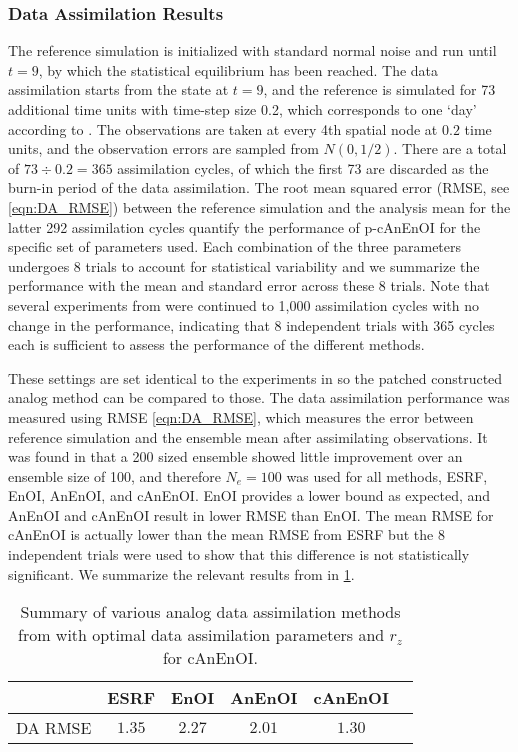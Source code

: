 \documentclass[final,3p]{elsarticle}
\theoremstyle{break}
\begin{document}
\subsubsection{Data Assimilation Results}\label{NR:DA}
The reference simulation is initialized with standard normal noise and run until $t=9$, by which the statistical equilibrium has been reached.
The data assimilation starts from the state at $t=9$, and the reference is simulated for 73 additional time units with time-step size 0.2, which corresponds to one `day' according to \cite{lorenz1996predictability}. 
The observations are taken at every 4th spatial node at $0.2$ time units, and the observation errors are sampled from $N(0,1/2)$.
There are a total of $73\div0.2=365$ assimilation cycles, of which the first 73 are discarded as the burn-in period of the data assimilation. 
The root mean squared error (RMSE, see \cref{eqn:DA_RMSE}) between the reference simulation and the analysis mean for the latter 292 assimilation cycles quantify the performance of p-cAnEnOI for the specific set of parameters used. 
Each combination of the three parameters undergoes 8 trials to account for statistical variability and we summarize the performance with the mean and standard error across these 8 trials.
Note that several experiments from \cite{grooms2020analog} were continued to 1,000 assimilation cycles with no change in the performance, indicating that 8 independent trials with 365 cycles each is sufficient to assess the performance of the different methods. \par

These settings are set identical to the experiments in \cite{grooms2020analog} so the patched constructed analog method can be compared to those.
The data assimilation performance was measured using RMSE \cref{eqn:DA_RMSE}, which measures the error between reference simulation and the ensemble mean after assimilating observations.
It was found in \cite{grooms2020analog} that a 200 sized ensemble showed little improvement over an ensemble size of 100, and therefore $N_e=100$ was used for all methods, ESRF, EnOI, AnEnOI, and cAnEnOI. 
EnOI provides a lower bound as expected, and AnEnOI and cAnEnOI result in lower RMSE than EnOI. 
The mean RMSE for cAnEnOI is actually lower than the mean RMSE from ESRF but the 8 independent trials were used to show that this difference is not statistically significant.
We summarize the relevant results from \cite{grooms2020analog} in \cref{table:summaryGrooms}. 
\begin{table}[h]
\centering
\begin{tabular}{ |c|c|c|c|c|c| }
     \hline
      & ESRF & EnOI & AnEnOI & cAnEnOI \\ \hline 
      DA RMSE & $1.35$ & $2.27$ & $2.01$ & $1.30$\\
     \hline
\end{tabular}
\caption{\label{table:summaryGrooms} Summary of various analog data assimilation methods from \cite{grooms2020analog} with optimal data assimilation parameters and $r_z$ for cAnEnOI.}
\end{table}
\end{document}
